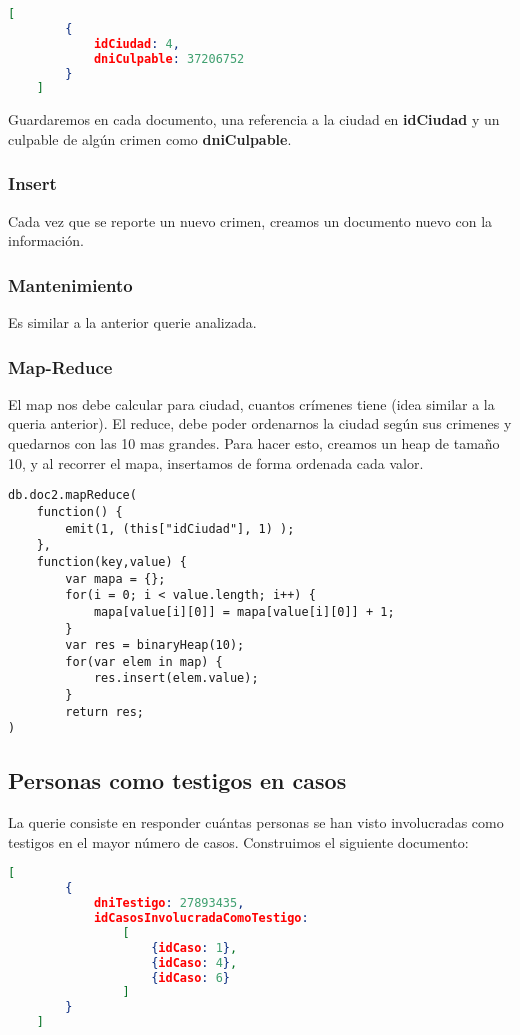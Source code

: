 \documentclass[11pt, a4paper]{article}
\begin{document}
\begin{lstlisting}[language=json]
	[
		{
			idCiudad: 4,
			dniCulpable: 37206752
		}
	]
\end{lstlisting}

Guardaremos en cada documento,  una referencia a la ciudad en \textbf{idCiudad} y un culpable de alg\'un crimen como \textbf{dniCulpable}.

\subsubsection{Insert}

Cada vez que se reporte un nuevo crimen, creamos un documento nuevo con la informaci\'on.

\subsubsection{Mantenimiento}

Es similar a la anterior querie analizada.

\subsubsection{Map-Reduce}

El map nos debe calcular para ciudad, cuantos cr\'imenes tiene (idea similar a la queria anterior). El reduce, debe poder ordenarnos la ciudad seg\'un sus crimenes y quedarnos con las 10 mas grandes. Para hacer esto, creamos un heap de tamaño 10, y al recorrer el mapa, insertamos de forma ordenada cada valor.
\begin{lstlisting}
db.doc2.mapReduce(
    function() {
        emit(1, (this["idCiudad"], 1) );
    },
    function(key,value) { 
        var mapa = {};
        for(i = 0; i < value.length; i++) {
            mapa[value[i][0]] = mapa[value[i][0]] + 1;
        }
        var res = binaryHeap(10);
        for(var elem in map) {
        	res.insert(elem.value);
        }
        return res;
)
\end{lstlisting}
\subsection{Personas como testigos en casos}

La querie consiste en responder cuántas personas se han visto involucradas como testigos en el mayor número de casos. Construimos el siguiente documento:

\begin{lstlisting}[language=json]
	[
		{
			dniTestigo: 27893435,
			idCasosInvolucradaComoTestigo:
				[
					{idCaso: 1},
					{idCaso: 4},
					{idCaso: 6}
				]
		}
	]
\end{lstlisting}
\end{document}
